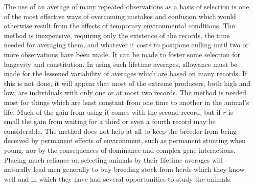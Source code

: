 The use of an average of many repeated observations as a basis of
selection is one of the most effective ways of overcoming mistakes and
confusion which would otherwise result from the effects of temporary
environmental conditions. The method is inexpensive, requiring only
the existence of the records, the time needed for averaging them, and
whatever it costs to postpone culling until two or more observations
have been made. It can be made to foster some selection for longevity
and constitution. In using such lifetime averages, allowance must be
made for the lessened variability of averages which are based on many
records. If this is not done, it will appear that most of the extreme producers,
both high and low, are individuals with only one or at most
two records. The method is needed most for things which are least constant
from one time to another in the animal's life. Much of the gain
from using it comes with the second record, but if $r$ is small the gain
from waiting for a third or even a fourth record may be considerable.
The method does not help at all to keep the breeder from being
deceived by permanent effects of environment, such as permanent
stunting when young, nor by the consequences of dominance and complex
gene interactions. Placing much reliance on selecting animals by
their lifetime averages will naturally lead men generally to buy breeding
stock from herds which they know well and in which they have
had several opportunities to study the animals.
